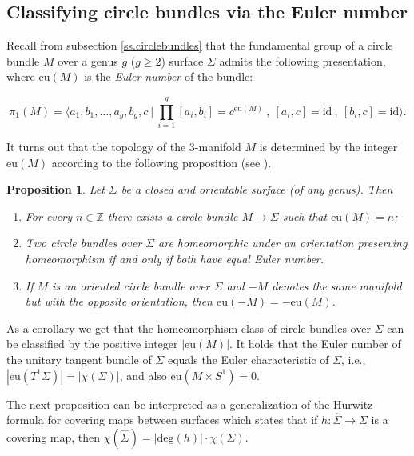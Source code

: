 \documentclass[11pt]{amsart} %
\numberwithin{equation}{section}
\newtheorem{prop}[equation]{Proposition}
\theoremstyle{remark}
\begin{document}
\subsection{Classifying circle bundles via the Euler number}\label{ss.hurwitz}

%
%
%

Recall from subsection \ref{ss.circlebundles} that the fundamental group of a circle bundle $M$ over a genus $g$ ($g \geq 2$) surface $\Sigma$ admits the following presentation, where $\mathrm{eu}(M)$ is the \emph{Euler number} of the bundle:

\[ \pi_1(M) = \bigg\langle a_1,b_1, \ldots, a_g, b_g, c \  | \  \prod_{i=1}^g [a_i,b_i] = c^{\mathrm{eu}(M)} \ , \ [a_i,c]= \mathrm{id} \ , \ [b_i,c]=\mathrm{id} \bigg \rangle.  \]  %
%
%

 
It turns out that the topology of the 3-manifold $M$ is determined by the integer $\mathrm{eu}(M)$ 
according to the following proposition (see \cite{Hatcher}). 

\begin{prop}
Let $\Sigma$ be a closed and orientable surface (of any genus). Then
\begin{enumerate}
\item For every $n\in\mathbb{Z}$ there exists a circle bundle $M\rightarrow\Sigma$ such that $\mathrm{eu}(M)=n$;
\item Two circle bundles over $\Sigma$ are homeomorphic under an orientation preserving homeomorphism if and only if both have equal Euler number.
\item If $M$ is an oriented circle bundle over $\Sigma$ and $-M$ denotes the same manifold but with the opposite orientation, then $\mathrm{eu}(-M)=-\mathrm{eu}(M)$.  
\end{enumerate} 
\end{prop}

As a corollary we get that the homeomorphism class of circle bundles over $\Sigma$ can be classified by the positive integer $|\mathrm{eu}(M)|$. It holds that the Euler number of the unitary tangent bundle of $\Sigma$ equals the Euler characteristic of $\Sigma$, i.e.,
$|\mathrm{eu}(T^1\Sigma)|=|\chi(\Sigma)|$, and also $\mathrm{eu}(M\times S^1)=0$. 

The next proposition can be interpreted as a generalization of the Hurwitz formula for covering maps between surfaces which states that if $h:\hat \Sigma \rightarrow \Sigma$ is a covering map, then $\chi(\hat \Sigma)=|\mathrm{deg}(h)|\cdot\chi(\Sigma)$. 
\end{document}
